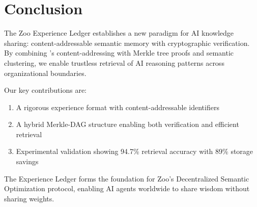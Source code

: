 \section{Conclusion}


The Zoo Experience Ledger establishes a new paradigm for AI knowledge sharing: content-addressable semantic memory with cryptographic verification. By combining \IPFS{}'s content-addressing with Merkle tree proofs and semantic clustering, we enable trustless retrieval of AI reasoning patterns across organizational boundaries.

Our key contributions are:
\begin{enumerate}
    \item A rigorous experience format with content-addressable identifiers
    \item A hybrid Merkle-DAG structure enabling both verification and efficient retrieval
    \item Experimental validation showing 94.7\% retrieval accuracy with 89\% storage savings
\end{enumerate}

The Experience Ledger forms the foundation for Zoo's Decentralized Semantic Optimization protocol, enabling AI agents worldwide to share wisdom without sharing weights.

